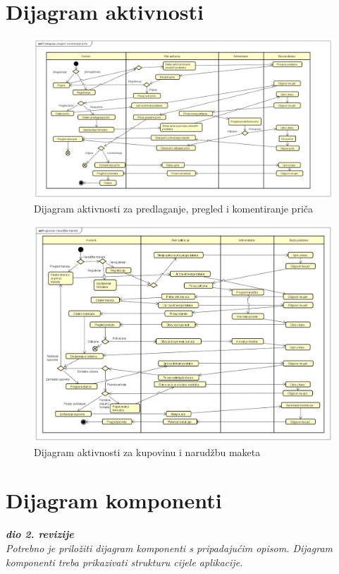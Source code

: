 			
			\eject 
		
		\section{Dijagram aktivnosti}
			
			\begin{figure}[H]
				\includegraphics[width=1\linewidth]{slike/Dijagram_aktivnosti_1.PNG} %
				\caption{Dijagram aktivnosti za predlaganje, pregled i komentiranje priča}
				\label{fig:diakt1} %
			\end{figure}

			\begin{figure}[H]
				\includegraphics[width=1\linewidth]{slike/Dijagram_aktivnosti_2.PNG} %
				\caption{Dijagram aktivnosti za kupovinu i narudžbu maketa}
				\label{fig:diakt2} %
			\end{figure}
			
			\eject
		\section{Dijagram komponenti}
		
			\textbf{\textit{dio 2. revizije}}\\
		
			 \textit{Potrebno je priložiti dijagram komponenti s pripadajućim opisom. Dijagram komponenti treba prikazivati strukturu cijele aplikacije.}